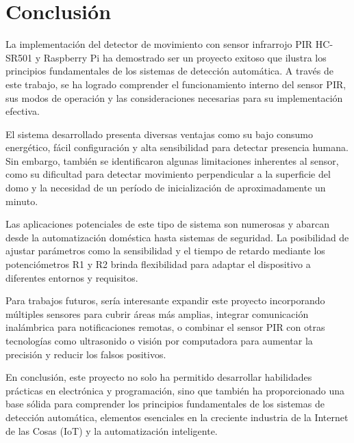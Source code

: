 \section*{Conclusión}

La implementación del detector de movimiento con sensor infrarrojo PIR HC-SR501 y Raspberry Pi ha demostrado ser un proyecto exitoso que ilustra los principios fundamentales de los sistemas de detección automática. A través de este trabajo, se ha logrado comprender el funcionamiento interno del sensor PIR, sus modos de operación y las consideraciones necesarias para su implementación efectiva.

El sistema desarrollado presenta diversas ventajas como su bajo consumo energético, fácil configuración y alta sensibilidad para detectar presencia humana. Sin embargo, también se identificaron algunas limitaciones inherentes al sensor, como su dificultad para detectar movimiento perpendicular a la superficie del domo y la necesidad de un período de inicialización de aproximadamente un minuto.

Las aplicaciones potenciales de este tipo de sistema son numerosas y abarcan desde la automatización doméstica hasta sistemas de seguridad. La posibilidad de ajustar parámetros como la sensibilidad y el tiempo de retardo mediante los potenciómetros R1 y R2 brinda flexibilidad para adaptar el dispositivo a diferentes entornos y requisitos.

Para trabajos futuros, sería interesante expandir este proyecto incorporando múltiples sensores para cubrir áreas más amplias, integrar comunicación inalámbrica para notificaciones remotas, o combinar el sensor PIR con otras tecnologías como ultrasonido o visión por computadora para aumentar la precisión y reducir los falsos positivos.

En conclusión, este proyecto no solo ha permitido desarrollar habilidades prácticas en electrónica y programación, sino que también ha proporcionado una base sólida para comprender los principios fundamentales de los sistemas de detección automática, elementos esenciales en la creciente industria de la Internet de las Cosas (IoT) y la automatización inteligente.